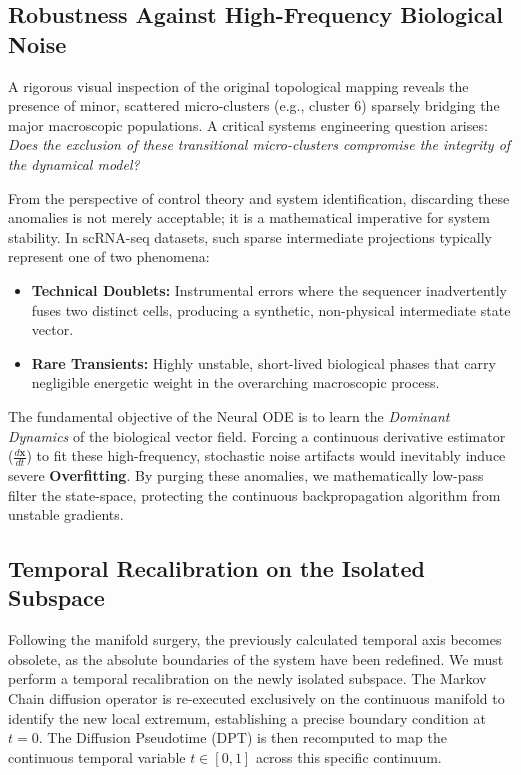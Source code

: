 \documentclass[12pt, a4paper]{article}
\begin{document}
	\subsection{Robustness Against High-Frequency Biological Noise}
	
	A rigorous visual inspection of the original topological mapping reveals the presence of minor, scattered micro-clusters (e.g., cluster 6) sparsely bridging the major macroscopic populations. A critical systems engineering question arises: \textit{Does the exclusion of these transitional micro-clusters compromise the integrity of the dynamical model?}
	
	From the perspective of control theory and system identification, discarding these anomalies is not merely acceptable; it is a mathematical imperative for system stability. In scRNA-seq datasets, such sparse intermediate projections typically represent one of two phenomena:
	\begin{itemize}
		\item \textbf{Technical Doublets:} Instrumental errors where the sequencer inadvertently fuses two distinct cells, producing a synthetic, non-physical intermediate state vector.
		\item \textbf{Rare Transients:} Highly unstable, short-lived biological phases that carry negligible energetic weight in the overarching macroscopic process.
	\end{itemize}
	The fundamental objective of the Neural ODE is to learn the \textit{Dominant Dynamics} of the biological vector field. Forcing a continuous derivative estimator ($\frac{d\mathbf{x}}{dt}$) to fit these high-frequency, stochastic noise artifacts would inevitably induce severe \textbf{Overfitting}. By purging these anomalies, we mathematically low-pass filter the state-space, protecting the continuous backpropagation algorithm from unstable gradients.
	
	\subsection{Temporal Recalibration on the Isolated Subspace}
	
	Following the manifold surgery, the previously calculated temporal axis becomes obsolete, as the absolute boundaries of the system have been redefined. We must perform a temporal recalibration on the newly isolated subspace. The Markov Chain diffusion operator is re-executed exclusively on the continuous manifold to identify the new local extremum, establishing a precise boundary condition at $t=0$. The Diffusion Pseudotime (DPT) is then recomputed to map the continuous temporal variable $t \in [0, 1]$ across this specific continuum.
	
\end{document}
